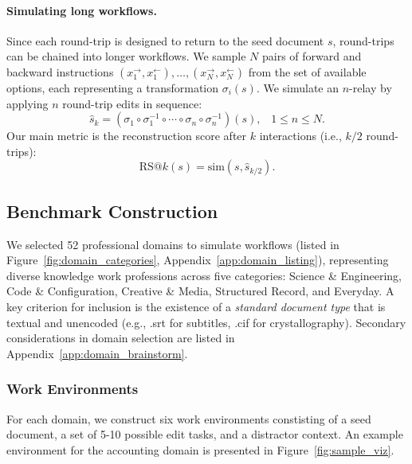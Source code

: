 \documentclass{article} %
\begin{document}
\paragraph{Simulating long workflows.}
Since each round-trip is designed to return to the seed document $s$, round-trips can be chained into longer workflows. We sample $N$ pairs of forward and backward instructions $(x_1^{\rightarrow}, x_1^{\leftarrow}), \ldots, (x_N^{\rightarrow}, x_N^{\leftarrow})$ from the set of available options, each representing a transformation $\sigma_i(s)$. We simulate an $n$-relay by applying $n$ round-trip edits in sequence:
$$\hat{s}_k = \left(\sigma_1 \circ \sigma_1^{-1} \circ \cdots \circ \sigma_n \circ \sigma_n^{-1} \right)(s), \;\;\; 1\leq n\leq N.$$
Our main metric is the reconstruction score after $k$ interactions (i.e., $k/2$ round-trips):
$$\textrm{RS}@k(s) = \mathrm{sim}(s, \hat{s}_{k/2}).$$

\subsection{Benchmark Construction}

We selected 52 professional domains to simulate workflows (listed in Figure~\ref{fig:domain_categories}, Appendix~\ref{app:domain_listing}), representing diverse knowledge work professions across five categories: Science \& Engineering, Code \& Configuration, Creative \& Media, Structured Record, and Everyday. A key criterion for inclusion is the existence of a \textit{standard document type} that is textual and unencoded (e.g., .srt for subtitles, .cif for crystallography). Secondary considerations in domain selection are listed in Appendix~\ref{app:domain_brainstorm}.

\subsubsection{Work Environments} \label{sec:work_environments}

For each domain, we construct six work environments constisting of a seed document, a set of 5-10 possible edit tasks, and a distractor context. An example environment for the accounting domain is presented in Figure~\ref{fig:sample_viz}. 
\end{document}
